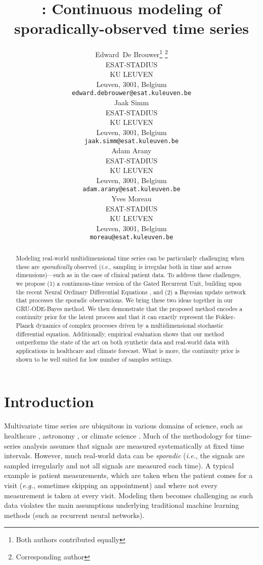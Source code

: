 \documentclass{article}
\title{\method: Continuous modeling of sporadically-observed time series}
\author{
  Edward~De Brouwer\thanks{Both authors contributed equally}  \thanks{Corresponding author} \\
  ESAT-STADIUS\\
  KU LEUVEN\\
  Leuven, 3001, Belgium \\
  \texttt{edward.debrouwer@esat.kuleuven.be} \\
\And
  Jaak Simm\footnotemark[1] \\
  ESAT-STADIUS \\
  KU LEUVEN \\
  Leuven, 3001, Belgium  \\
  \texttt{jaak.simm@esat.kuleuven.be}\\
  \AND
  Adam Arany \\
  ESAT-STADIUS \\
  KU LEUVEN \\
  Leuven, 3001, Belgium\\
   \texttt{adam.arany@esat.kuleuven.be}\\
  \And
  Yves Moreau \\
   ESAT-STADIUS \\
   KU LEUVEN \\
  Leuven, 3001, Belgium\\
  \texttt{moreau@esat.kuleuven.be}\\
}
\newcommand{\method}{GRU-ODE-Bayes}
\begin{document}
\maketitle

\begin{abstract}
Modeling real-world multidimensional time series can be particularly challenging when these are \emph{sporadically} observed (\emph{i.e.}, sampling is irregular both in time and across dimensions)---such as in the case of clinical patient data. To address these challenges, we propose (1) a continuous-time version of the Gated Recurrent Unit, building upon the recent Neural Ordinary Differential Equations \citep{neural_ode}, and (2) a Bayesian update network that processes the sporadic observations. We bring these two ideas together in our \method{} method. We then demonstrate that the proposed method encodes a continuity prior for the latent process and that it can exactly represent the Fokker-Planck dynamics of complex processes driven by a multidimensional stochastic differential equation. 
Additionally, empirical evaluation shows that our method outperforms the state of the art on both synthetic data and real-world data with applications in healthcare and climate forecast. What is more, the continuity prior is shown to be well suited for low number of samples settings.

\end{abstract}

\section{Introduction}


Multivariate time series are ubiquitous in various domains of science, such as healthcare \citep{jensen2014temporal}, astronomy \citep{scargle1982studies}, or climate science \citep{schneider2001analysis}. Much of the methodology for time-series analysis assumes that signals are measured systematically at fixed time intervals. 
However, much real-world data can be \emph{sporadic} (\emph{i.e.}, the signals are sampled irregularly and not all signals are measured each time). A typical example is patient measurements, which are taken when the patient comes for a visit (\emph{e.g.,} sometimes skipping an appointment) and where not every measurement is taken at every visit. Modeling then becomes challenging as such data violates the main assumptions underlying traditional machine learning methods (such as recurrent neural networks). 
\end{document}
